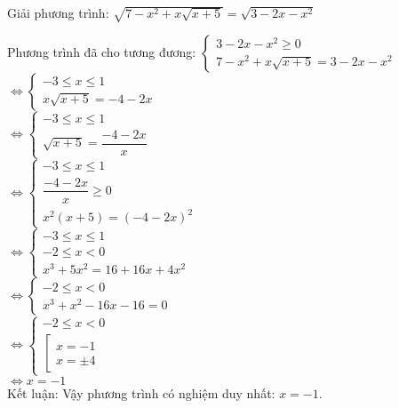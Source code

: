 \begin{baitap}
 Giải phương trình: $ \sqrt{7-x^2 + x \sqrt{x+5} } = \sqrt{3-2x -x^2}  $
\begin{loigiai1}
    Phương trình đã cho tương đương: 
    $
    \begin{cases}
        3-2x -x^2 \geq 0 \\
        7-x^2 + x \sqrt{x+5} = 3-2x -x^2 
    \end{cases} $ \\
    
   $ \Leftrightarrow 
    \begin{cases}
        -3 \leq x \leq 1 \\
        x \sqrt{x+5} = -4 -2x  
    \end{cases} $  \\

     $ \Leftrightarrow 
    \begin{cases}
        -3 \leq x \leq 1 \\
         \sqrt{x+5} = \dfrac{-4-2x}{x}  
    \end{cases} $ \\ 

     $ \Leftrightarrow 
    \begin{cases}
        -3 \leq x \leq 1 \\
        \dfrac{-4-2x}{x} \geq 0 \\
        x^2( x+5) = (-4-2x)^2   
    \end{cases} $  \\
    
     $ \Leftrightarrow 
    \begin{cases}
        -3 \leq x \leq 1 \\
        -2 \leq x <0 \\
        x^3 +5x^2 = 16 +16x +4x^2  
    \end{cases} $ \\
    
     $ \Leftrightarrow 
    \begin{cases}
        -2 \leq x <0 \\
        x^3 +x^2 -16x -16  =   0
    \end{cases} $ \\
    
    $ \Leftrightarrow 
    \begin{cases}
        -2 \leq x <0 \\
        \left[
            \begin{array}{l}
                x=-1 \\
                x = \pm 4
            \end{array}
        \right. 
    \end{cases} $ \\
    $ \Leftrightarrow x=-1 $ \\
    Kết luận: Vậy phương trình có nghiệm duy nhất: $ x=-1 $.
\end{loigiai1}

\end{baitap}

